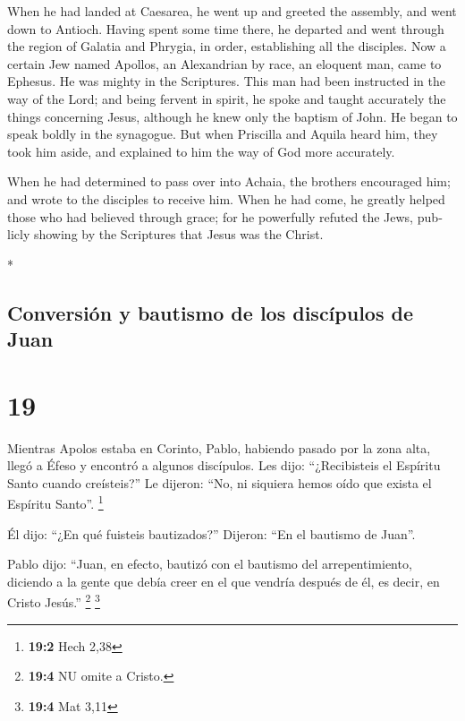 \begin{paracol}{2}
\begin{otherlanguage}{english}
 When he had landed at Caesarea, he went up and greeted
the assembly, and went down to Antioch.  Having spent
some time there, he departed and went through the region of Galatia and
Phrygia, in order, establishing all the disciples.  Now a
certain Jew named Apollos, an Alexandrian by race, an eloquent man, came
to Ephesus. He was mighty in the Scriptures.  This man
had been instructed in the way of the Lord; and being fervent in spirit,
he spoke and taught accurately the things concerning Jesus, although he
knew only the baptism of John.  He began to speak boldly
in the synagogue. But when Priscilla and Aquila heard him, they took him
aside, and explained to him the way of God more accurately.

 When he had determined to pass over into Achaia, the
brothers encouraged him; and wrote to the disciples to receive him. When
he had come, he greatly helped those who had believed through grace;
 for he powerfully refuted the Jews, publicly showing by
the Scriptures that Jesus was the Christ.

\end{otherlanguage}

\switchcolumn[0]*

\hypertarget{conversiuxf3n-y-bautismo-de-los-discuxedpulos-de-juan}{%
\subsection{Conversión y bautismo de los discípulos de
Juan}\label{conversiuxf3n-y-bautismo-de-los-discuxedpulos-de-juan}}

\hypertarget{section-36}{%
\section{19}\label{section-36}}

 Mientras Apolos estaba en Corinto, Pablo, habiendo pasado
por la zona alta, llegó a Éfeso y encontró a algunos discípulos.
 Les dijo: ``¿Recibisteis el Espíritu Santo cuando
creísteis?'' Le dijeron: ``No, ni siquiera hemos oído que exista el
Espíritu Santo''. \footnote{\textbf{19:2} Hech 2,38}

 Él dijo: ``¿En qué fuisteis bautizados?'' Dijeron: ``En
el bautismo de Juan''.

 Pablo dijo: ``Juan, en efecto, bautizó con el bautismo
del arrepentimiento, diciendo a la gente que debía creer en el que
vendría después de él, es decir, en Cristo Jesús.'' \footnote{\textbf{19:4}
  NU omite a Cristo.} \footnote{\textbf{19:4} Mat 3,11}


\end{paracol}
